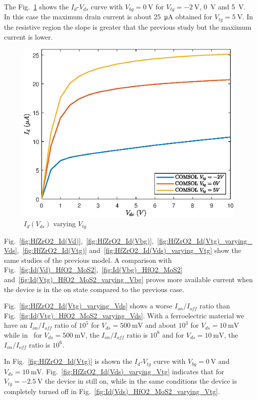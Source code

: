 \documentclass[electronics,article,submit,moreauthors,pdftex]{Definitions/mdpi}
\begin{document}
The Fig.~\ref{fig:HfZrO2_Id(Vd)_varying_Vtg_high_Vd} shows the $I_d$-$V_{ds}$ curve with $V_{bg} = \SI{0}{\volt}$ for $V_{tg} = \SI{-2}{\volt}$, \SI{0}{\volt} and \SI{5}{\volt}. In this case the maximum drain current is about \SI{25}{\micro \ampere} obtained for $V_{tg} = \SI{5}{\volt}$. In the resistive region the slope is greater that the previous study but the maximum current is lower.

\begin{figure}[h]
	\centering
	\includegraphics[width=.8\textwidth]{Grafici/HfZrO2_Id(Vd)_varying_Vtg_high_Vd.eps} 
	\caption{$I_d(V_{ds})$ varying $V_{tg}$}
	\label{fig:HfZrO2_Id(Vd)_varying_Vtg_high_Vd}
\end{figure} 


Fig.~\ref{fig:HfZrO2_Id(Vd)},~\ref{fig:HfZrO2_Id(Vbg)},~\ref{fig:HfZrO2_Id(Vtg)_varying_Vds},~\ref{fig:HfZrO2_Id(Vtg)} and~\ref{fig:HfZrO2_Id(Vds)_varying_Vtg} show the same studies of the previous model. A comparison with Fig.~\ref{fig:Id(Vd)_HfO2_MoS2},~\ref{fig:Id(Vbg)_HfO2_MoS2} and~\ref{fig:Id(Vtg)_HfO2_MoS2_varying_Vbg} proves more available current when the device is in the on state compared to the previous case.

Fig.~\ref{fig:HfZrO2_Id(Vtg)_varying_Vds} shows a worse $I_{on}/I_{off}$ ratio than Fig.~\ref{fig:Id(Vtg)_HfO2_MoS2_varying_Vds}. With a ferroelectric material we have an $I_{on}/I_{off}$ ratio of $10^5$ for $V_{ds}=\SI{500}{\milli \volt}$ and about $10^3$ for $V_{ds}=\SI{10}{\milli \volt}$ while in~\cite{Radisavljevic:Si_MoS2} for $V_{ds} = \SI{500}{\milli \volt}$, the $I_{on}/I_{off}$ ratio is $10^8$ and for $V_{ds} = \SI{10}{\milli \volt}$, the $I_{on}/I_{off}$ ratio is $10^6$.

In Fig.~\ref{fig:HfZrO2_Id(Vtg)} is shown the $I_d$-$V_{tg}$ curve with $V_{bg}=\SI{0}{\volt}$ and $V_{ds} = \SI{10}{\milli \volt}$.
Fig.~\ref{fig:HfZrO2_Id(Vds)_varying_Vtg} indicates that for $V_{tg} = \SI{-2.5}{\volt}$ the device in still on, while in the same conditions the device is completely turned off in Fig.~\ref{fig:Id(Vds)_HfO2_MoS2_varying_Vtg}.
\end{document}
